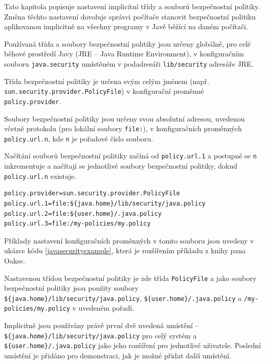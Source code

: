 Tato kapitola popisuje nastavení implicitní třídy a souborů bezpečnostní politiky. Změna těchto nastavení dovoluje správci počítače
stanovit bezpečnostní politiku aplikovanou implicitně na všechny programy v Javě běžící na daném počítači.

Používaná třída a soubory bezpečnostní politiky jsou určeny globálně, pro celé běhové prostředí Javy (JRE -- Java Runtime Environment),
v konfiguračním souboru {\tt java.security} umístěném v podadresáři {\tt lib/security} adresáře JRE. \cite{refPolicyFiles}

Třída bezpečnostní politiky je určena svým celým jménem (např. {\tt sun.security.provider{\linebreak}.PolicyFile}) v konfigurační proměnné {\tt policy.provider}. \cite{refPolicyFiles}

Soubory bezpečnostní politiky jsou určeny svou absolutní adresou, uvedenou včetně protokolu (pro lokální soubory {\tt file:}),
v konfiguračních proměnných {\tt policy.url.n}, kde {\tt n} je pořadové číslo souboru. \cite{refPolicyFiles}

Načítání souborů bezpečnostní politiky začíná od {\tt policy.url.1} a postupně se {\tt n} inkrementuje a načítají se jednotlivé soubory bezpečnostní politiky,
dokud {\tt policy.url.n} existuje. \cite{refPolicyFiles}

\begin{lstlisting}[caption=Význačnější proměnné konfiguračního souboru {\tt java.security}, label=javasecurityexample]
policy.provider=sun.security.provider.PolicyFile
policy.url.1=file:${java.home}/lib/security/java.policy
policy.url.2=file:${user.home}/.java.policy
policy.url.3=file:/my-policies/my.policy
\end{lstlisting}

Příklady nastavení konfiguračních proměnných v tomto souboru jsou uvedeny v ukázce kódu \ref{javasecurityexample}, která je rozšířením příkladu z knihy pana Oakse. \cite[5.3.1]{oaks}

Nastavenou třídou bezpečnostní politiky je zde třída {\tt PolicyFile} a jako soubory bezpečnostní politiky jsou použity
soubory {\tt \$\{java.home\}/lib/security/java.policy}, {\tt \$\{user{\linebreak}.home\}/.java.policy} a {\tt /my-policies/my.policy} v uvedeném pořadí.

Implicitně jsou používány právě první dvě uvedená umístění -- {\tt \$\{java.home\}/lib/secu{\linebreak}rity/java.policy} pro celý systém a {\tt \$\{user.home\}/.java.policy} jako jeho rozšíření pro jednotlivé uživatele. Poslední umístění je přidáno pro demonstraci, jak je možné přidat další umístění. \cite{refSecurity}

